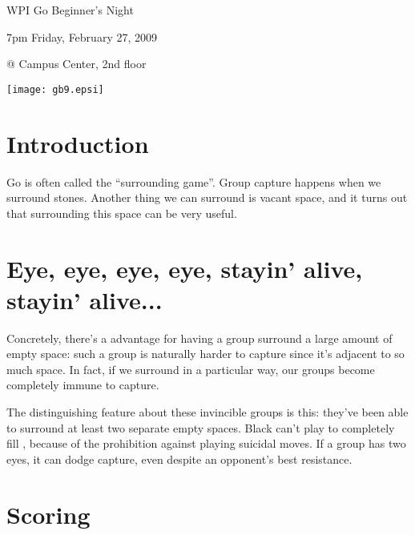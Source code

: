 \documentclass{article}
\begin{document}
\centerline{\Huge WPI Go Beginner's Night}
\centerline{\Huge 7pm Friday, February 27, 2009}
\centerline{\Huge @ Campus Center, 2nd floor}
\vfill

\begin{center}
\texttt{[image: gb9.epsi]}
\end{center}

\vfill

\newpage

\section*{Introduction}

Go is often called the ``surrounding game''.  Group capture happens
when we surround stones.  Another thing we can surround is vacant
space, and it turns out that surrounding this space can be
very useful.


\section*{Eye, eye, eye, eye, stayin' alive, stayin' alive...}

Concretely, there's a advantage for having a group surround a large
amount of empty space: such a group is naturally harder to capture
since it's adjacent to so much space.  In fact, if we surround in a
particular way, our groups become completely immune to capture.


The distinguishing feature about these invincible groups is this:
they've been able to surround at least two separate empty spaces.
Black can't play to completely fill \igotriangle, because of the
prohibition against playing suicidal moves.  If a group has two eyes,
it can dodge capture, even despite an opponent's best resistance.








\section*{Scoring}
\end{document}
